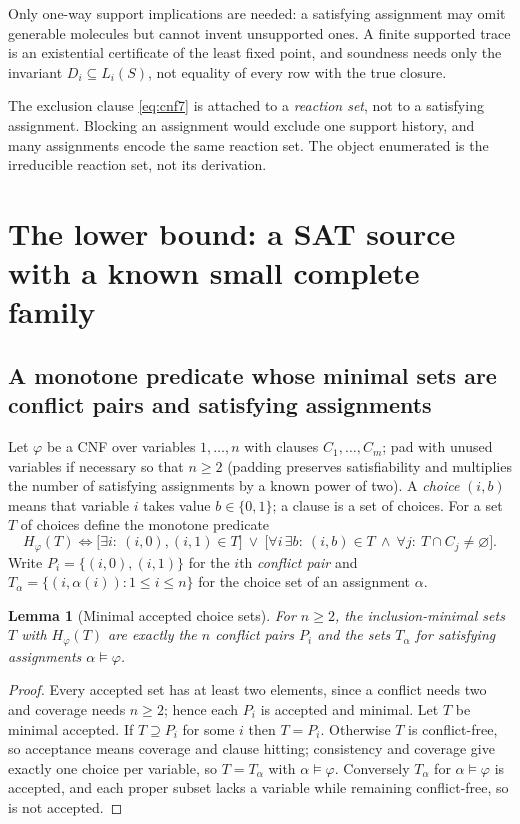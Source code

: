 \documentclass[11pt,a4paper]{article}
\theoremstyle{plain}
\newtheorem{lemma}[theorem]{Lemma}
\theoremstyle{definition}
\theoremstyle{remark}
\begin{document}
Only one-way support implications are needed: a satisfying assignment may omit generable molecules but cannot invent unsupported ones. A finite supported trace is an existential certificate of the least fixed point, and soundness needs only the invariant $D_i\subseteq L_i(S)$, not equality of every row with the true closure.

The exclusion clause \eqref{eq:cnf7} is attached to a \emph{reaction set}, not to a satisfying assignment. Blocking an assignment would exclude one support history, and many assignments encode the same reaction set. The object enumerated is the irreducible reaction set, not its derivation.

\section{The lower bound: a SAT source with a known small complete family}\label{sec:lower}

\subsection{A monotone predicate whose minimal sets are conflict pairs and satisfying assignments}

Let $\varphi$ be a CNF over variables $1,\dots,n$ with clauses $C_1,\dots,C_m$; pad with unused variables if necessary so that $n\ge2$ (padding preserves satisfiability and multiplies the number of satisfying assignments by a known power of two). A \emph{choice} $(i,b)$ means that variable $i$ takes value $b\in\{0,1\}$; a clause is a set of choices. For a set $T$ of choices define the monotone predicate
\begin{equation}\label{eq:H}
 H_\varphi(T)\iff\bigl[\exists i:\ (i,0),(i,1)\in T\bigr]\ \vee\ \bigl[\forall i\,\exists b:\ (i,b)\in T\ \wedge\ \forall j:\ T\cap C_j\neq\varnothing\bigr].
\end{equation}
Write $P_i=\{(i,0),(i,1)\}$ for the $i$th \emph{conflict pair} and $T_\alpha=\{(i,\alpha(i)):1\le i\le n\}$ for the choice set of an assignment $\alpha$.

\begin{lemma}[Minimal accepted choice sets]\label{lem:choices}
For $n\ge2$, the inclusion-minimal sets $T$ with $H_\varphi(T)$ are exactly the $n$ conflict pairs $P_i$ and the sets $T_\alpha$ for satisfying assignments $\alpha\models\varphi$.
\end{lemma}
\begin{proof}
Every accepted set has at least two elements, since a conflict needs two and coverage needs $n\ge2$; hence each $P_i$ is accepted and minimal. Let $T$ be minimal accepted. If $T\supseteq P_i$ for some $i$ then $T=P_i$. Otherwise $T$ is conflict-free, so acceptance means coverage and clause hitting; consistency and coverage give exactly one choice per variable, so $T=T_\alpha$ with $\alpha\models\varphi$. Conversely $T_\alpha$ for $\alpha\models\varphi$ is accepted, and each proper subset lacks a variable while remaining conflict-free, so is not accepted.
\end{proof}
\end{document}
